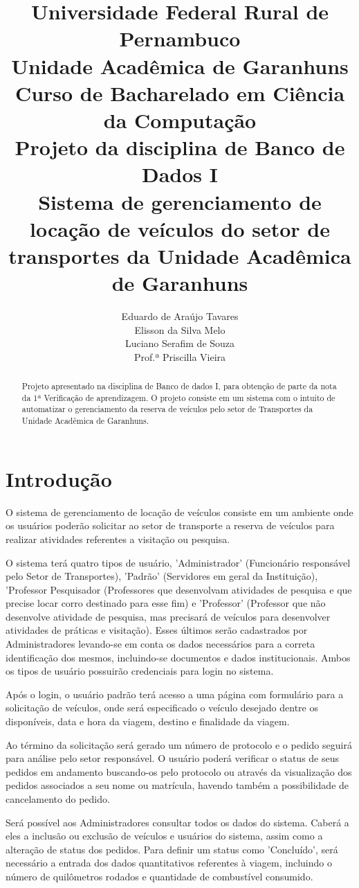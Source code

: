\documentclass[11pt]{article}
\author{Eduardo de Araújo Tavares\\Elisson da Silva Melo\\Luciano Serafim de Souza\\Prof.ª Priscilla Vieira}
\title{Universidade Federal Rural de Pernambuco\\Unidade Acadêmica de Garanhuns\\Curso de Bacharelado em Ciência da Computação\vspace{5mm}\\ {\large Projeto da disciplina de Banco de Dados I\\Sistema de gerenciamento de locação de veículos do setor de transportes da Unidade Acadêmica de Garanhuns}}
\begin{document}
\frenchspacing

\maketitle

\begin{abstract}
Projeto apresentado na disciplina de Banco de dados I, para obtenção de parte da nota da 1ª Verificação de aprendizagem. O projeto consiste em um sistema com o intuito de automatizar o gerenciamento da reserva de veículos pelo setor de Transportes da Unidade Acadêmica de Garanhuns.
\end{abstract}
\section{Introdução}
O sistema de gerenciamento de locação de veículos consiste em um ambiente onde os usuários poderão solicitar ao setor de transporte a reserva de veículos para realizar atividades referentes a visitação ou pesquisa.

O sistema terá quatro tipos de usuário, 'Administrador' (Funcionário responsável pelo Setor de Transportes), 'Padrão' (Servidores em geral da Instituição), 'Professor Pesquisador (Professores que desenvolvam atividades de pesquisa e que precise locar corro destinado para esse fim) e 'Professor' (Professor que não desenvolve atividade de pesquisa, mas precisará de veículos para desenvolver atividades de práticas e visitação). Esses últimos serão cadastrados por Administradores levando-se em conta os dados necessários para a correta identificação dos mesmos, incluindo-se documentos e dados institucionais. Ambos os tipos de usuário possuirão credenciais para login no sistema.

Após o login, o usuário padrão terá acesso a uma página com formulário para a solicitação de veículos, onde será especificado o veículo desejado dentre os disponíveis, data e hora da viagem, destino e finalidade da viagem.

Ao término da solicitação será gerado um número de protocolo e o pedido seguirá para análise pelo setor responsável. O usuário poderá verificar o status de seus pedidos em andamento buscando-os pelo protocolo ou através da visualização dos pedidos associados a seu nome ou matrícula, havendo também a possibilidade de cancelamento do pedido.

Será possível aos Administradores consultar todos os dados do sistema. Caberá a eles a inclusão ou exclusão de veículos e usuários do sistema, assim como a alteração de status dos pedidos. Para definir um status como 'Concluído', será necessário a entrada dos dados quantitativos referentes à viagem, incluindo o número de quilômetros rodados e quantidade de combustível consumido.
\end{document}
